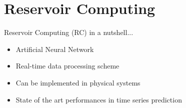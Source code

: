 \section{Reservoir Computing}


\begin{frame}{Reservoir Computing (RC) in a nutshell...}
	\begin{itemize}
		\item Artificial Neural Network
		\item Real-time data processing scheme
		\item Can be implemented in physical systems
		\item State of the art performances in time series prediction
	\end{itemize}
\end{frame}


